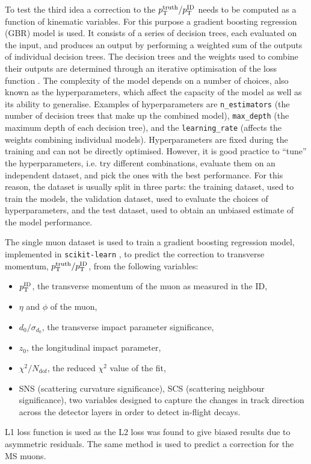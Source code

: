 To test the third idea a correction to the $p_{\text{T}}^\text{truth}/p_{\text{T}}^\text{ID}$
needs to be computed as a function of kinematic variables.
For this purpose a gradient boosting regression (GBR) model is used. It consists of a
series of decision trees, each evaluated on the input, and produces
an output by performing a weighted sum of the outputs of individual
decision trees. The decision trees and the weights used to
combine their outputs are determined through an iterative optimisation of
the loss function \cite{FRIEDMAN2002367, generalised_boosting_models, 2016arXiv160302754C, NIPS2017_6907}.
The complexity of the model depends on a number of choices, also
known as the hyperparameters, which affect the capacity of the model
as well as its ability to generalise. Examples of hyperparameters
are \texttt{n\_estimators} (the number of decision trees that make up the combined model),
\texttt{max\_depth} (the maximum depth of each decision tree), and
the \texttt{learning\_rate} (affects the weights combining individual models).
Hyperparameters are fixed during the training and can not be directly
optimised. However, it is good practice to ``tune'' the hyperparameters,
i.e. try different combinations, evaluate them on an independent dataset,
and pick the ones with the best performance. For this reason, the dataset is usually
split in three parts: the training dataset, used to train the models, the validation
dataset, used to evaluate the choices of hyperparameters, and the test dataset, used to
obtain an unbiased estimate of the model performance.

The single muon dataset is used to train a
gradient boosting regression model, implemented in \texttt{scikit-learn}
\cite{scikit-learn}, to predict the correction to transverse momentum,
$p_{\text{T}}^\text{truth}/p_{\text{T}}^\text{ID}$, from the following variables:
\begin{itemize}
\item $p_{\text{T}}^\text{ID}$, the transverse momentum of the muon as
measured in the ID,
\item $\eta$ and $\phi$ of the muon,
\item $d_0/\sigma_{d_0}$, the transverse impact parameter significance,
\item $z_0$, the longitudinal impact parameter,
\item $\chi^2/N_\text{dof}$, the reduced $\chi^2$ value of the fit,
\item SNS (scattering curvature significance), SCS (scattering
neighbour significance), two variables designed to capture the changes
in track direction across the detector layers in order to detect 
in-flight decays.
\end{itemize}
L1 loss function is used as the L2 loss was found to give biased
results due to asymmetric residuals. The same method is used
to predict a correction for the MS muons.

